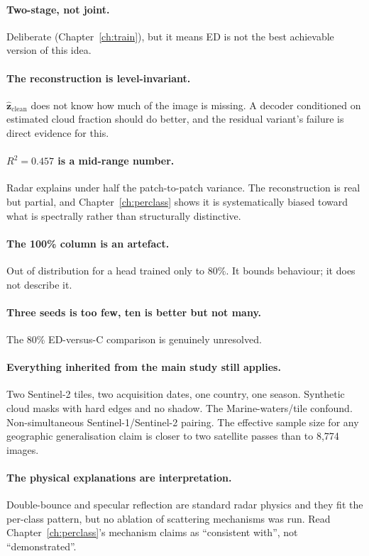 \documentclass[11pt,a4paper]{report}
\newcommand{\zh}{\hat{\mathbf{z}}_{\text{clean}}}
\begin{document}
\paragraph{Two-stage, not joint.} Deliberate (Chapter~\ref{ch:train}), but it
means ED is not the best achievable version of this idea.

\paragraph{The reconstruction is level-invariant.} $\zh$ does not know how much
of the image is missing. A decoder conditioned on estimated cloud fraction
should do better, and the residual variant's failure is direct evidence for
this.

\paragraph{$R^2 = 0.457$ is a mid-range number.} Radar explains under half the
patch-to-patch variance. The reconstruction is real but partial, and
Chapter~\ref{ch:perclass} shows it is systematically biased toward what is
spectrally rather than structurally distinctive.

\paragraph{The 100\% column is an artefact.} Out of distribution for a head
trained only to 80\%. It bounds behaviour; it does not describe it.

\paragraph{Three seeds is too few, ten is better but not many.} The 80\%
ED-versus-C comparison is genuinely unresolved.

\paragraph{Everything inherited from the main study still applies.} Two
Sentinel-2 tiles, two acquisition dates, one country, one season. Synthetic
cloud masks with hard edges and no shadow. The Marine-waters/tile confound.
Non-simultaneous Sentinel-1/Sentinel-2 pairing. The effective sample size for
any geographic generalisation claim is closer to two satellite passes than to
8{,}774 images.

\paragraph{The physical explanations are interpretation.} Double-bounce and
specular reflection are standard radar physics and they fit the per-class
pattern, but no ablation of scattering mechanisms was run. Read
Chapter~\ref{ch:perclass}'s mechanism claims as ``consistent with'', not
``demonstrated''.
\end{document}
